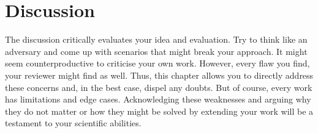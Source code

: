 \chapter{Discussion}\label{sec:discussion}
The discussion critically evaluates your idea and evaluation.
Try to think like an adversary and come up with scenarios that might break your approach.
It might seem counterproductive to criticise your own work.
However, every flaw you find, your reviewer might find as well.
Thus, this chapter allows you to directly address these concerns and, in the best case, dispel any doubts.
But of course, every work has limitations and edge cases.
Acknowledging these weaknesses and arguing why they do not matter or how they might be solved by extending your work will be a testament to your scientific abilities.
